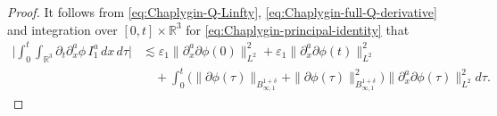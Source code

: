 \documentclass[10pt,a4paper]{amsart}
\def\ls{\lesssim}
\begin{document}
\begin{proof}
		It follows from \eqref{eq:Chaplygin-Q-Linfty},
		\eqref{eq:Chaplygin-full-Q-derivative} and integration over
		$[0,t]\times\mathbb R^3$ for
		\eqref{eq:Chaplygin-principal-identity} that
		\begin{equation}\label{eq:Chaplygin-I1-estimate}
			\begin{aligned}
				\big|
				\int_0^t\int_{\mathbb R^3}
				\partial_t\partial_x^a\phi\,
				I_1^a\,dx\,d\tau
				\big|
				&\ls
				\varepsilon_1
				\|\partial_x^a\partial\phi(0)\|_{L^2}^2
				+
				\varepsilon_1
				\|\partial_x^a\partial\phi(t)\|_{L^2}^2
				\\
				&\quad+
				\int_0^t
				\big(
				\|\partial\phi(\tau)\|_{B_{\infty,1}^{1+\delta}}
				+
				\|\partial\phi(\tau)\|_{B_{\infty,1}^{1+\delta}}^2
				\big)
				\|\partial_x^a\partial\phi(\tau)\|_{L^2}^2
				d\tau.
			\end{aligned}
		\end{equation}
		

\end{proof}
\end{document}
